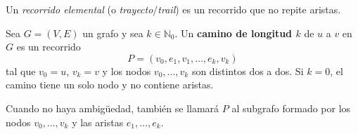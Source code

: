             \begin{observacion}
                Un \emph{recorrido elemental} (o \emph{trayecto}/\emph{trail}) es un recorrido que no repite aristas.
            \end{observacion}

            \begin{definicion}[Camino]
                Sea $G=(V,E)$ un grafo y sea $k\in\mathbb{N}_0$. Un \textbf{camino de longitud $k$} de $u$ a $v$ en $G$ es un recorrido
                \[
                    P=(v_0,e_1,v_1,\dots,e_k,v_k)
                \]
                tal que $v_0=u$, $v_k=v$ y los nodos $v_0,\dots,v_k$ son distintos dos a dos. Si $k=0$, el camino tiene un solo nodo y no contiene aristas.

                Cuando no haya ambigüedad, también se llamará $P$ al subgrafo formado por los nodos $v_0,\dots,v_k$ y las aristas $e_1,\dots,e_k$.
            \end{definicion}


